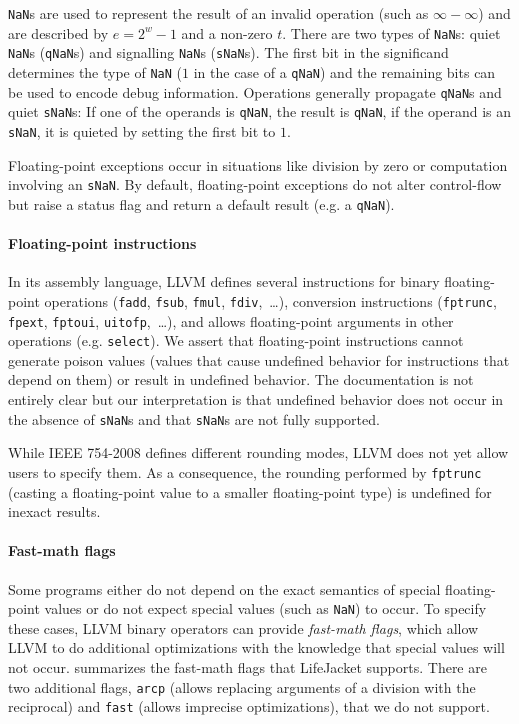 \documentclass[preprint, numbers]{sigplanconf}
\newcommand{\xxx}{LifeJacket}
\begin{document}
\texttt{NaN}s are used to represent the result of an invalid operation (such as
$\infty - \infty$) and are described by $e = 2^w - 1$ and a non-zero $t$.
There are two types of \texttt{NaN}s: quiet \texttt{NaN}s (\texttt{qNaN}s) and
signalling \texttt{NaN}s (\texttt{sNaN}s). The first bit in the significand
determines the type of \texttt{NaN} ($1$ in the case of a \texttt{qNaN}) and
the remaining bits can be used to encode debug information. Operations
generally propagate \texttt{qNaN}s and quiet \texttt{sNaN}s: If one of the
operands is \texttt{qNaN}, the result is \texttt{qNaN}, if the operand is an
\texttt{sNaN}, it is quieted by setting the first bit to $1$.

Floating-point exceptions occur in situations like division by zero or
computation involving an \texttt{sNaN}. By default, floating-point exceptions
do not alter control-flow but raise a status flag and return a default result
(e.g. a \texttt{qNaN}).

\paragraph{Floating-point instructions} In its assembly language, LLVM defines
several instructions for binary floating-point operations (\texttt{fadd},
\texttt{fsub}, \texttt{fmul}, \texttt{fdiv},~\ldots), conversion instructions
(\texttt{fptrunc}, \texttt{fpext}, \texttt{fptoui}, \texttt{uitofp},~\ldots),
and allows floating-point arguments in other operations (e.g. \texttt{select}).
We assert that floating-point instructions cannot generate poison values
(values that cause undefined behavior for instructions that depend on them) or
result in undefined behavior. The documentation is not entirely clear but our
interpretation is that undefined behavior does not occur in the absence of
\texttt{sNaN}s and that \texttt{sNaN}s are not fully supported.

While IEEE 754-2008 defines different rounding modes, LLVM does not yet allow
users to specify them. As a consequence, the rounding performed by
\texttt{fptrunc} (casting a floating-point value to a smaller floating-point
type) is undefined for inexact results.

\paragraph{Fast-math flags}
Some programs either do not depend on the exact
semantics of special floating-point values or do not expect special values
(such as \texttt{NaN}) to occur. To specify these cases, LLVM binary operators can
provide \emph{fast-math flags}, which allow LLVM to do additional optimizations with
the knowledge that special values will not occur. 
summarizes the fast-math flags that \xxx{} supports. There are two additional
flags, \texttt{arcp} (allows replacing arguments of a division with the
reciprocal) and \texttt{fast} (allows imprecise optimizations), that we do not
support.
\end{document}

